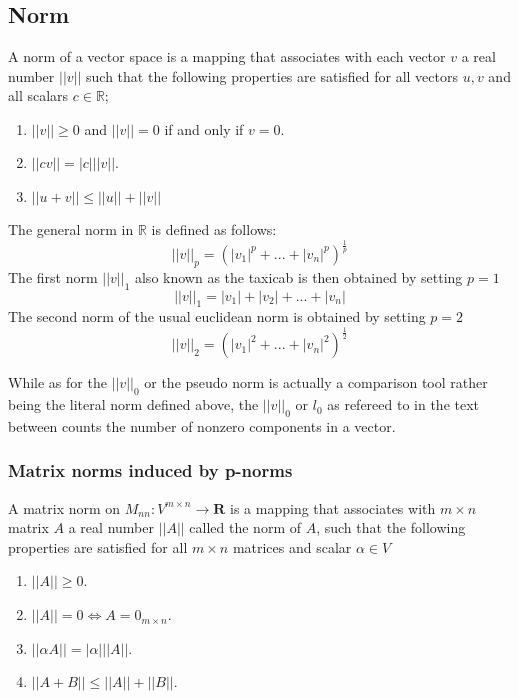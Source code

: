 \chapter{}
\section{Norm}

A norm of a vector space is a mapping that associates with each vector $ v $ a real number $||v||$ such that the following properties are satisfied for all vectors $ u, v $ and all scalars $ c \in \mathbb{R} $; 
\begin{enumerate}
	\item $ ||v|| \geq 0 $ and $ ||v|| = 0 $ if and only if $ v = 0 $.
	\item $||cv|| = |c| ||v||$.
	\item $||u+v|| \leq ||u|| + ||v||$
\end{enumerate}
The general norm in $ \mathbb{R} $ is defined as follows: 
\begin{equation}\label{key}
||v||_p = (|v_1|^p + ... + |v_n|^p)^{\frac{1}{p}}
\end{equation}
The first norm $ ||v||_1 $ also known as the taxicab is then obtained by setting $ p = 1 $ \begin{equation}\label{key}
||v||_1 = |v_1| + |v_2| + ... + |v_n|
\end{equation}
The second norm of the usual euclidean norm is obtained by setting $ p = 2 $ \begin{equation}\label{key}
||v||_2 = (|v_1|^2+...+|v_n|^2)^{\frac{1}{2}}
\end{equation} 

While as for the $ ||v||_0 $ or the pseudo norm is actually a comparison tool rather being the literal norm defined above, the $ ||v||_0 $ or $ l_0 $ as refereed to in the text  between counts the number of nonzero components in a vector. 
\subsection{Matrix norms induced by  p-norms}
A matrix norm on $ M_{nn} : V^{m\times n} \longrightarrow \mathbf{R}$ is a mapping that associates with $ m\times n $ matrix $ A $ a real number $ ||A|| $ called the norm of $ A $, such that the following properties are satisfied for all $ m \times n $ matrices and scalar $ \alpha \in V$ \begin{enumerate}
	\item $ ||A|| \geq 0 $.
	\item $ ||A|| = 0 \Longleftrightarrow A = 0_{m\times n} $. 
	\item $ ||\alpha A|| = |\alpha| ||A||$.
	\item $ ||A+B|| \leq ||A|| + ||B|| $.
\end{enumerate}

